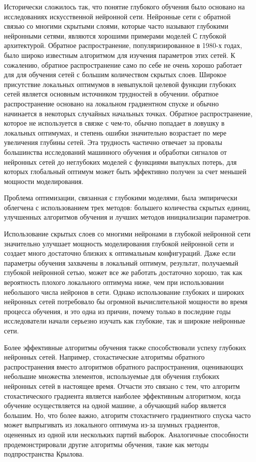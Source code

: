 Исторически сложилось так, что понятие глубокого обучения было основано на исследованиях искусственной нейронной сети. Нейронные сети с обратной связью со многими скрытыми слоями, которые часто называют глубокими нейронными сетями, являются хорошими примерами моделей С глубокой архитектурой. Обратное распространение, популяризированное в 1980-х годах, было широко известным алгоритмом для изучения параметров этих сетей. К сожалению, обратное распространение само по себе не очень хорошо работает для для обучения сетей с большим количеством скрытых слоев. Широкое присутствие локальных оптимумов в невыпуклой целевой функции глубоких сетей является основным источником трудностей в обучении. обратное распространение основано на локальном градиентном спуске и обычно начинается в некоторых случайных начальных точках. Обратное распространение, которое не используется в связке с чем-то, обычно попадает в ловушку в локальных оптимумах, и степень ошибки значительно возрастает по мере увеличения глубины сетей. Эта трудность частично отвечает за провалы большинства исследований машинного обучения и обработки сигналов от нейронных сетей до неглубоких моделей с функциями выпуклых потерь, для которых глобальный оптимум может быть эффективно получен за счет меньшей мощности моделирования.

Проблема оптимизации, связанная с глубокими моделями, была эмпирически облегчена с использованием трех методов: большего количества скрытых единиц, улучшенных алгоритмов обучения и лучших методов инициализации параметров.

Использование скрытых слоев со многими нейронами в глубокой нейронной сети значительно улучшает мощность моделирования глубокой нейронной сети и создает много достаточно близких к оптимальным конфигураций. Даже если параметры обучения  захвачены в локальный оптимум, результат, получаемый глубокой нейронной сетью, может все же работать достаточно хорошо, так как вероятность плохого локального оптимума ниже, чем при использовании небольшого числа нейронов в сети. Однако использование глубоких и широких нейронных сетей потребовало бы огромной вычислительной мощности во время процесса обучения, и это одна из причин, почему только в последние годы исследователи начали серьезно изучать как глубокие, так и широкие нейронные сети.

Более эффективные алгоритмы обучения также способствовали успеху глубоких нейронных сетей. Например, стохастические алгоритмы обратного распространения вместо алгоритмов обратного распространения, оценивающих небольшие множества элементов, используемые для обучения глубоких нейронных сетей в настоящее время. Отчасти это связано с тем, что алгоритм стохастического градиента является наиболее эффективным алгоритмом, когда обучение осуществляется на одной машине, а обучающий набор является большим. Но, что более важно, алгоритм стохастичего градиентного спуска часто может выпрыгивать из локального оптимума из-за шумных градиентов, оцененных из одной или нескольких партий выборок. Аналогичные способности продемонстрировали другие алгоритмы обучения, такие как методы подпространства Крылова.

